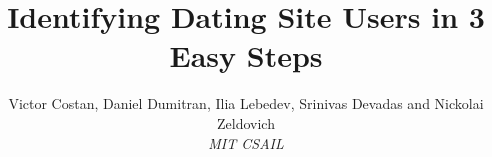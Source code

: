 \documentclass[10pt,twocolumn]{article}
\begin{document}
\title{Identifying Dating Site Users in 3 Easy Steps}
\author{
  Victor Costan, Daniel Dumitran, Ilia Lebedev,
  Srinivas Devadas and Nickolai Zeldovich \\ \em MIT CSAIL}
\date{}

\maketitle








\setlength{\bibsep}{1pt}
\small


\end{document}
